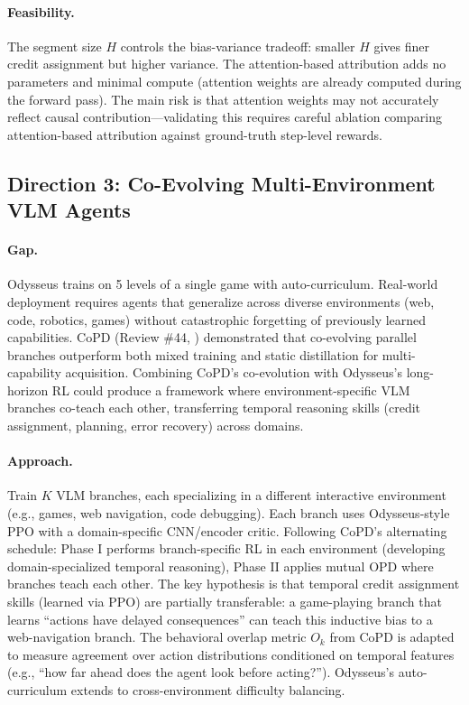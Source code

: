 \documentclass[11pt]{article}
\begin{document}
\paragraph{Feasibility.}
The segment size $H$ controls the bias-variance tradeoff: smaller $H$ gives finer credit assignment but higher variance. The attention-based attribution adds no parameters and minimal compute (attention weights are already computed during the forward pass). The main risk is that attention weights may not accurately reflect causal contribution---validating this requires careful ablation comparing attention-based attribution against ground-truth step-level rewards.

\subsection{Direction 3: Co-Evolving Multi-Environment VLM Agents}

\paragraph{Gap.}
Odysseus trains on 5 levels of a single game with auto-curriculum. Real-world deployment requires agents that generalize across diverse environments (web, code, robotics, games) without catastrophic forgetting of previously learned capabilities. CoPD (Review \#44, \cite{copd}) demonstrated that co-evolving parallel branches outperform both mixed training and static distillation for multi-capability acquisition. Combining CoPD's co-evolution with Odysseus's long-horizon RL could produce a framework where environment-specific VLM branches co-teach each other, transferring temporal reasoning skills (credit assignment, planning, error recovery) across domains.

\paragraph{Approach.}
Train $K$ VLM branches, each specializing in a different interactive environment (e.g., games, web navigation, code debugging). Each branch uses Odysseus-style PPO with a domain-specific CNN/encoder critic. Following CoPD's alternating schedule: Phase I performs branch-specific RL in each environment (developing domain-specialized temporal reasoning), Phase II applies mutual OPD where branches teach each other. The key hypothesis is that temporal credit assignment skills (learned via PPO) are partially transferable: a game-playing branch that learns ``actions have delayed consequences'' can teach this inductive bias to a web-navigation branch. The behavioral overlap metric $O_k$ from CoPD is adapted to measure agreement over action distributions conditioned on temporal features (e.g., ``how far ahead does the agent look before acting?''). Odysseus's auto-curriculum extends to cross-environment difficulty balancing.
\end{document}
